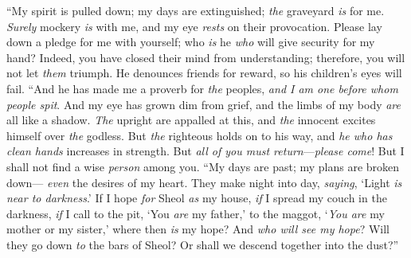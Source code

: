 \begin{biblechapter} %
 “My spirit is pulled down; my days are extinguished; 
\textit{the} graveyard \textit{is} for me.
\verse \textit{Surely} mockery \textit{is} with me, 
and my eye \textit{rests} on their provocation.
\verse Please lay down a pledge for me with yourself; 
who \textit{is} he \textit{who} will give security for my hand?
\verse Indeed, you have closed their mind from understanding; 
therefore, you will not let \textit{them} triumph.
\verse He denounces friends for reward, 
so his children’s eyes will fail.
\verse “And he has made me a proverb for \textit{the} peoples, 
\textit{and I am one before whom people spit}.
\verse And my eye has grown dim from grief, 
and the limbs of my body \textit{are} all like a shadow.
\verse \textit{The} upright are appalled at this, 
and \textit{the} innocent excites himself over \textit{the} godless.
\verse But \textit{the} righteous holds on to his way, 
and \textit{he who has clean hands} increases in strength.
\verse But \textit{all of you must return}—\textit{please come}! 
But I shall not find a wise \textit{person} among you.
\verse “My days are past; my plans are broken down— 
\textit{even} the desires of my heart.
\verse They make night into day, 
\textit{saying}, ‘Light \textit{is} \textit{near to darkness}.’
\verse If I hope \textit{for} Sheol \textit{as} my house, 
\textit{if} I spread my couch in the darkness,
\verse \textit{if} I call to the pit, ‘You \textit{are} my father,’ 
to the maggot, ‘\textit{You are} my mother or my sister,’
\verse where then \textit{is} my hope? 
And \textit{who will see my hope}?
\verse Will they go down \textit{to} the bars of Sheol? 
Or shall we descend together into the dust?”
\end{biblechapter}

